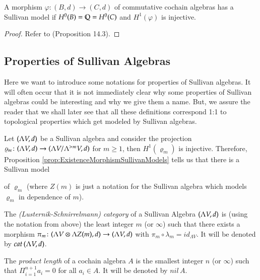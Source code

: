 \begin{Proposition}
\label{prop:ExistenceMorphismSullivanModels}
 A morphism $\varphi \colon (B,d) \to (C,d)$ of commutative cochain algebras has a Sullivan model
 if $H^0(B) = \mathbb{Q} = H^0(C)$ and $H^1(\varphi)$ is injective.
\end{Proposition}
\begin{proof}
 Refer to \cite{Felix2001} (Proposition 14.3).
\end{proof}

\subsection{Properties of Sullivan Algebras}
Here we want to introduce some notations for properties of Sullivan algebras. It will often occur that it is not 
immediately clear why some properties of Sullivan algebras could be interesting and why we give them a name. But, we assure
the reader that we shall later see that all these definitions correspond 1:1 to topological properties which
get modeled by Sullivan algebras.
\par

Let $(\Lambda V,d)$ be a Sullivan algebra and consider the projection 
$\varrho_m \colon (\Lambda V,d) \to (\Lambda V / \Lambda^{> m} V , d)$ for $m \geq 1$, then $H^1(\varrho_m)$ is injective.
Therefore, Proposition \ref{prop:ExistenceMorphismSullivanModels} tells us that there is a Sullivan model

\centerline{
}

of $\varrho_m$ (where $Z(m)$ is just a notation for the Sullivan algebra which models $\varrho_m$ in dependence of $m$).

\begin{Definition}
\label{def:LSCategory}
 The \emph{(Lusternik-Schnirrelmann) category} of a Sullivan Algebra $(\Lambda V,d)$ is (using the notation from above) the 
 least integer $m$ (or $\infty$) such that there exists a morphism 
 $\pi_m \colon (\Lambda V \otimes \Lambda Z(m) , d) \to (\Lambda V,d)$ with $\pi_m \circ \lambda_m = id_{\Lambda V}$.
 It will be denoted by $cat \, (\Lambda V,d)$.
\end{Definition}

\begin{Definition}
 The \emph{product length} of a cochain algebra $A$ is the smallest integer $n$ (or $\infty$) such that 
 $\Pi_{i = 1}^{n+1} a_i = 0$  for all $a_i \in A$. It will be denoted by $nil \,A$.
\end{Definition}

